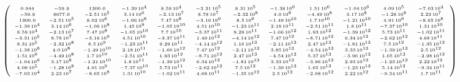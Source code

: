 \documentclass{article}
\begin{document}
\[    \tiny\left(\begin{array}{cccccccccccc} 0.944 & -59.8 & 1300.0 & -1.39\,{10}^4 & 8.59\,{10}^4 & -3.31\,{10}^5 & 8.31\,{10}^5 & -1.38\,{10}^6 & 1.51\,{10}^6 & -1.04\,{10}^6 & 4.09\,{10}^5 & -7.03\,{10}^4\\ -59.8 & 8677.0 & -2.51\,{10}^5 & 3.14\,{10}^6 & -2.13\,{10}^7 & 8.78\,{10}^7 & -2.32\,{10}^8 & 4.0\,{10}^8 & -4.49\,{10}^8 & 3.17\,{10}^8 & -1.28\,{10}^8 & 2.23\,{10}^7\\ 1300.0 & -2.51\,{10}^5 & 8.02\,{10}^6 & -1.06\,{10}^8 & 7.47\,{10}^8 & -3.16\,{10}^9 & 8.5\,{10}^9 & -1.49\,{10}^{10} & 1.7\,{10}^{10} & -1.21\,{10}^{10} & 4.91\,{10}^9 & -8.65\,{10}^8\\ -1.39\,{10}^4 & 3.14\,{10}^6 & -1.06\,{10}^8 & 1.45\,{10}^9 & -1.05\,{10}^{10} & 4.51\,{10}^{10} & -1.23\,{10}^{11} & 2.18\,{10}^{11} & -2.51\,{10}^{11} & 1.8\,{10}^{11} & -7.37\,{10}^{10} & 1.31\,{10}^{10}\\ 8.59\,{10}^4 & -2.13\,{10}^7 & 7.47\,{10}^8 & -1.05\,{10}^{10} & 7.7\,{10}^{10} & -3.37\,{10}^{11} & 9.29\,{10}^{11} & -1.66\,{10}^{12} & 1.93\,{10}^{12} & -1.39\,{10}^{12} & 5.73\,{10}^{11} & -1.02\,{10}^{11}\\ -3.31\,{10}^5 & 8.78\,{10}^7 & -3.16\,{10}^9 & 4.51\,{10}^{10} & -3.37\,{10}^{11} & 1.49\,{10}^{12} & -4.14\,{10}^{12} & 7.47\,{10}^{12} & -8.71\,{10}^{12} & 6.34\,{10}^{12} & -2.62\,{10}^{12} & 4.68\,{10}^{11}\\ 8.31\,{10}^5 & -2.32\,{10}^8 & 8.5\,{10}^9 & -1.23\,{10}^{11} & 9.29\,{10}^{11} & -4.14\,{10}^{12} & 1.16\,{10}^{13} & -2.11\,{10}^{13} & 2.47\,{10}^{13} & -1.81\,{10}^{13} & 7.5\,{10}^{12} & -1.35\,{10}^{12}\\ -1.38\,{10}^6 & 4.0\,{10}^8 & -1.49\,{10}^{10} & 2.18\,{10}^{11} & -1.66\,{10}^{12} & 7.47\,{10}^{12} & -2.11\,{10}^{13} & 3.85\,{10}^{13} & -4.54\,{10}^{13} & 3.33\,{10}^{13} & -1.39\,{10}^{13} & 2.5\,{10}^{12}\\ 1.51\,{10}^6 & -4.49\,{10}^8 & 1.7\,{10}^{10} & -2.51\,{10}^{11} & 1.93\,{10}^{12} & -8.71\,{10}^{12} & 2.47\,{10}^{13} & -4.54\,{10}^{13} & 5.37\,{10}^{13} & -3.96\,{10}^{13} & 1.65\,{10}^{13} & -2.98\,{10}^{12}\\ -1.04\,{10}^6 & 3.17\,{10}^8 & -1.21\,{10}^{10} & 1.8\,{10}^{11} & -1.39\,{10}^{12} & 6.34\,{10}^{12} & -1.81\,{10}^{13} & 3.33\,{10}^{13} & -3.96\,{10}^{13} & 2.93\,{10}^{13} & -1.23\,{10}^{13} & 2.22\,{10}^{12}\\ 4.09\,{10}^5 & -1.28\,{10}^8 & 4.91\,{10}^9 & -7.37\,{10}^{10} & 5.73\,{10}^{11} & -2.62\,{10}^{12} & 7.5\,{10}^{12} & -1.39\,{10}^{13} & 1.65\,{10}^{13} & -1.23\,{10}^{13} & 5.14\,{10}^{12} & -9.34\,{10}^{11}\\ -7.03\,{10}^4 & 2.23\,{10}^7 & -8.65\,{10}^8 & 1.31\,{10}^{10} & -1.02\,{10}^{11} & 4.68\,{10}^{11} & -1.35\,{10}^{12} & 2.5\,{10}^{12} & -2.98\,{10}^{12} & 2.22\,{10}^{12} & -9.34\,{10}^{11} & 1.7\,{10}^{11} \end{array}\right)
\]
\end{document}
